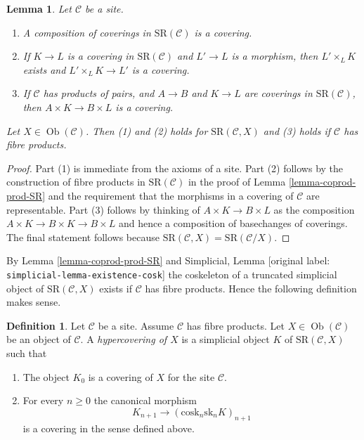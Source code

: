 \documentclass[10pt,a4paper]{article}
\theoremstyle{plain}
\newtheorem{lemma}[subsection]{Lemma}
\theoremstyle{definition}
\newtheorem{definition}[subsection]{Definition}
\theoremstyle{remark}
\numberwithin{equation}{subsection}
\def\Ob{\mathop{\mathrm{Ob}}\nolimits}
\begin{document}
\begin{lemma}
\label{lemma-covering-permanence}
Let $\mathcal{C}$ be a site.
\begin{enumerate}
\item A composition of coverings in $\text{SR}(\mathcal{C})$
is a covering.
\item If $K \to L$ is a covering in $\text{SR}(\mathcal{C})$
and $L' \to L$ is a morphism, then $L' \times_L K$ exists
and $L' \times_L K \to L'$ is a covering.
\item If $\mathcal{C}$ has products of pairs, and
$A \to B$ and $K \to L$ are coverings in $\text{SR}(\mathcal{C})$,
then $A \times K \to B \times L$ is a covering.
\end{enumerate}
Let $X \in \Ob(\mathcal{C})$. Then (1) and (2) holds for
$\text{SR}(\mathcal{C}, X)$ and (3) holds if $\mathcal{C}$
has fibre products.
\end{lemma}

\begin{proof}
Part (1) is immediate from the axioms of a site.
Part (2) follows by the construction of fibre products
in $\text{SR}(\mathcal{C})$ in the proof of
Lemma \ref{lemma-coprod-prod-SR}
and the requirement that the morphisms in a covering
of $\mathcal{C}$ are representable.
Part (3) follows by thinking of $A \times K \to B \times L$
as the composition $A \times K \to B \times K \to B \times L$
and hence a composition of basechanges of coverings.
The final statement follows because $\text{SR}(\mathcal{C}, X) =
\text{SR}(\mathcal{C}/X)$.
\end{proof}

\noindent
By Lemma \ref{lemma-coprod-prod-SR} and
Simplicial, Lemma \textnormal{[original label: \nolinkurl{simplicial-lemma-existence-cosk}]}
the coskeleton of a truncated simplicial object of
$\text{SR}(\mathcal{C}, X)$ exists if $\mathcal{C}$ has fibre products.
Hence the following definition makes sense.

\begin{definition}
\label{definition-hypercovering}
Let $\mathcal{C}$ be a site. Assume $\mathcal{C}$ has fibre products.
Let $X \in \Ob(\mathcal{C})$ be an object of $\mathcal{C}$.
A {\it hypercovering of $X$} is a simplicial object
$K$ of $\text{SR}(\mathcal{C}, X)$ such that
\begin{enumerate}
\item The object $K_0$ is a covering of $X$ for the site $\mathcal{C}$.
\item For every $n \geq 0$ the canonical morphism
$$
K_{n + 1} \longrightarrow (\text{cosk}_n \text{sk}_n K)_{n + 1}
$$
is a covering in the sense defined above.
\end{enumerate}
\end{definition}
\end{document}
